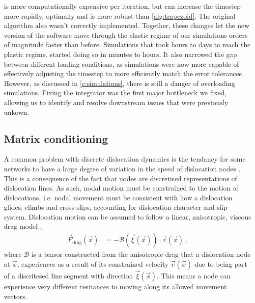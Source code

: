  is more computationally expensive per iteration, but can increase the timestep more rapidly, optimally and is more robust than \cref{alg:trapezoid}. The original algorithm also wasn't correctly implemented. Together, these changes let the new version of the software move through the elastic regime of our simulations orders of magnitude faster than before. Simulations that took hours to days to reach the plastic regime, started doing so in minutes to hours. It also narrowed the gap between different loading conditions, as simulations were now more capable of effectively adjusting the timestep to more efficiently match the error tolerances. However, as discussed in \cref{c:simulations}, there is still a danger of overloading simulations. Fixing the integrator was the first major bottleneck we fixed, allowing us to identify and resolve downstream issues that were previously unkown.

\subsection{Matrix conditioning}
\label{ss:matrix}

A common problem with discrete dislocation dynamics is the tendancy for some networks to have a large degree of variation in the speed of dislocation nodes \cite{bertin2019gpu,ddlab,arsenlis2007enabling}. This is a consequence of the fact that nodes are discretised representations of dislocation lines. As such, nodal motion must be constrained to the motion of dislocations, i.e. nodal movement must be consistent with how a dislocation glides, climbs and cross-slips, accounting for dislocation character and slip system. Dislocation motion can be assumed to follow a linear, anisotropic, viscous drag model \cite{ddlab},
\begin{align}\label{eq:dragCoef}
    \vec{F}_\textrm{drag}(\vec{x}) & = -\mathcal{B}(\vec{\xi}(\vec{x})) \cdot \vec{v}(\vec{x})\,,
\end{align}
where $\mathcal{B}$ is a tensor constructed from the anisotropic drag that a dislocation node at $\vec{x}$, experiences as a result of its constrained velocity $\vec{v}(\vec{x})$ due to being part of a discritesed line segment with direction $\vec{\xi}(\vec{x})$. This means a node can experience very different resitances to moving along its allowed movement vectors.

